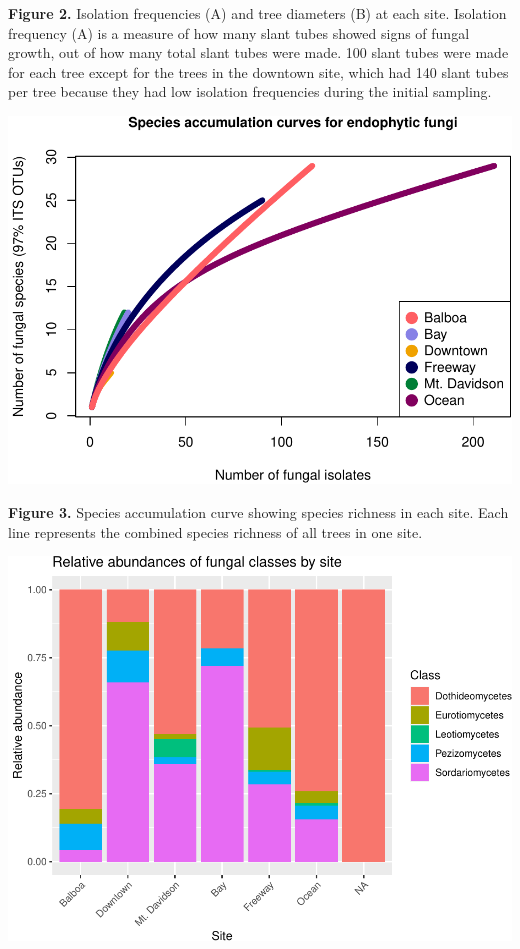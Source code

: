 \documentclass[fleqn,10pt,lineno]{wlpeerj} %
\begin{document}
\textbf{Figure 2.} Isolation frequencies (A) and tree diameters (B) at
each site. Isolation frequency (A) is a measure of how many slant tubes
showed signs of fungal growth, out of how many total slant tubes were
made. 100 slant tubes were made for each tree except for the trees in
the downtown site, which had 140 slant tubes per tree because they had
low isolation frequencies during the initial sampling.

\includegraphics{gibson2021_files/figure-latex/rarefaction-1.pdf}

\textbf{Figure 3.} Species accumulation curve showing species richness
in each site. Each line represents the combined species richness of all
trees in one site.

\includegraphics{gibson2021_files/figure-latex/bar-graph-1.pdf}
\end{document}
